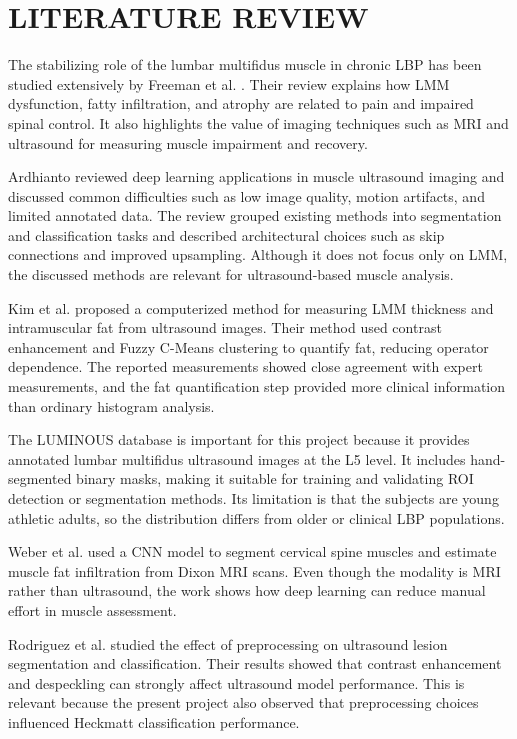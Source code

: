 \chapter{LITERATURE REVIEW}
\label{relatedwork}
The stabilizing role of the lumbar multifidus muscle in chronic LBP has been studied extensively by Freeman et al. \cite{Freeman2010}. Their review explains how LMM dysfunction, fatty infiltration, and atrophy are related to pain and impaired spinal control. It also highlights the value of imaging techniques such as MRI and ultrasound for measuring muscle impairment and recovery.

Ardhianto \cite{DeepLearningChallenges2021} reviewed deep learning applications in muscle ultrasound imaging and discussed common difficulties such as low image quality, motion artifacts, and limited annotated data. The review grouped existing methods into segmentation and classification tasks and described architectural choices such as skip connections and improved upsampling. Although it does not focus only on LMM, the discussed methods are relevant for ultrasound-based muscle analysis.

Kim et al. \cite{Kim2020} proposed a computerized method for measuring LMM thickness and intramuscular fat from ultrasound images. Their method used contrast enhancement and Fuzzy C-Means clustering to quantify fat, reducing operator dependence. The reported measurements showed close agreement with expert measurements, and the fat quantification step provided more clinical information than ordinary histogram analysis.

The LUMINOUS database \cite{Belasso2020} is important for this project because it provides annotated lumbar multifidus ultrasound images at the L5 level. It includes hand-segmented binary masks, making it suitable for training and validating ROI detection or segmentation methods. Its limitation is that the subjects are young athletic adults, so the distribution differs from older or clinical LBP populations.

Weber et al. \cite{Weber2021} used a CNN model to segment cervical spine muscles and estimate muscle fat infiltration from Dixon MRI scans. Even though the modality is MRI rather than ultrasound, the work shows how deep learning can reduce manual effort in muscle assessment.

Rodriguez et al. \cite{Rodriguez2017} studied the effect of preprocessing on ultrasound lesion segmentation and classification. Their results showed that contrast enhancement and despeckling can strongly affect ultrasound model performance. This is relevant because the present project also observed that preprocessing choices influenced Heckmatt classification performance.

